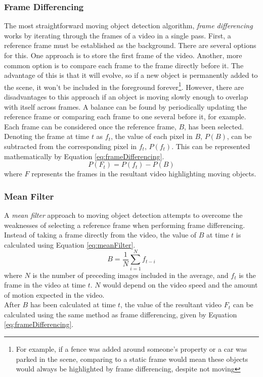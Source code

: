 \setlength{\leftskip}{0cm}
\subsubsection{Frame Differencing}
\setlength{\leftskip}{0.5cm}
\indent \indent
The most straightforward moving object detection algorithm, \textit{frame differencing} works by iterating through the frames of a video in a single pass. First, a reference frame must be established as the background. There are several options for this. One approach is to store the first frame of the video. Another, more common option is to compare each frame to the frame directly before it. The advantage of this is that it will evolve, so if a new object is permanently added to the scene, it won't be included in the foreground forever\footnote{For example, if a fence was added around someone's property or a car was parked in the scene, comparing to a static frame would mean these objects would always be highlighted by frame differencing, despite not moving}. However, there are disadvantages to this approach if an object is moving slowly enough to overlap with itself across frames. A balance can be found by periodically updating the reference frame or comparing each frame to one several before it, for example.
\smallskip \\ \indent
Each frame can be considered once the reference frame, $B$, has been selected. Denoting the frame at time $t$ as $f_t$, the value of each pixel in $B$, $P(B)$, can be subtracted from the corresponding pixel in $f_t$, $P(f_t)$. This can be represented mathematically by Equation \ref{eq:frameDifferencing}.
\begin{equation}
    \label{eq:frameDifferencing}
    P(F_t) = P(f_t) - P(B)
\end{equation}
where $F$ represents the frames in the resultant video highlighting moving objects.

\setlength{\leftskip}{0cm}
\subsubsection{Mean Filter}
\setlength{\leftskip}{0.5cm}
\indent \indent
A \textit{mean filter} approach to moving object detection attempts to overcome the weaknesses of selecting a reference frame when performing frame differencing. Instead of taking a frame directly from the video, the value of $B$ at time $t$ is calculated using Equation \ref{eq:meanFilter}.
\begin{equation}
    \label{eq:meanFilter}
    B = \frac{1}{N} \sum^N_{i=1} f_{t-i}
\end{equation}
where $N$ is the number of preceding images included in the average, and $f_t$ is the frame in the video at time $t$. $N$ would depend on the video speed and the amount of motion expected in the video.
\smallskip \\ \indent
After $B$ has been calculated at time $t$, the value of the resultant video $F_t$ can be calculated using the same method as frame differencing, given by Equation \ref{eq:frameDifferencing}.

